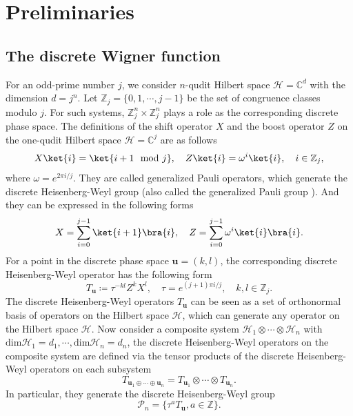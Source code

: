 \documentclass[aps,pra,twocolumn,floatfix,amsfonts,10pt]{revtex4-2}
\begin{document}
\section{Preliminaries}

\subsection{The discrete Wigner function}
For an odd-prime number $j$, we consider $n$-qudit Hilbert space $\mathcal{H}=\mathbb{C}^d$ with the dimension $d=j^n$.
Let $\mathbb{Z}_{j} = \{0,1,\cdots,j-1\}$ be the set of congruence classes modulo $j$.
For such systems, $\mathbb{Z}_{j}^{n} \times \mathbb{Z}_{j}^{n}$ plays a role as the corresponding discrete phase space. 
The definitions of the shift operator $X$ and the boost operator $Z$ on the one-qudit Hilbert space $\mathcal{H} = \mathbb{C}^j$ are as follows \cite{S1960}
\begin{equation}
	X \ket{i} = \ket{i+1\mod j}, \quad Z \ket{i} = \omega^i \ket{i}, \quad i \in \mathbb{Z}_{j}, 
\end{equation}
where $\omega = e^{2 \pi i/j}$.
They are called generalized Pauli operators, which generate the discrete Heisenberg-Weyl group (also called the generalized Pauli group \cite{G1997}). 
And they can be expressed in the following forms
\begin{equation}
	X = \sum_{i=0}^{j-1} \ket{i+1} \bra{i}, \quad Z=\sum_{i=0}^{j-1} \omega^i \ket{i} \bra{i}.
\end{equation}
For a point in the discrete phase space $\mathbf{u} = (k,l)$, the corresponding discrete Heisenberg-Weyl operator has the following form 
\begin{equation}
	T_{\mathbf{u}} \coloneqq \tau^{-kl} Z^k X^l,\quad \tau = e^{(j+1)\pi i/j},\quad  k,l \in \mathbb{Z}_{j}.
\end{equation}
The discrete Heisenberg-Weyl operators $T_\mathbf{u}$ can be seen as a set of orthonormal basis of operators on the Hilbert space $\mathcal{H}$, which can generate any operator on the Hilbert space $\mathcal{H}$. 
Now consider a composite system $\mathcal{H}_1 \otimes \cdots \otimes \mathcal{H}_n$ with $\mathrm{dim} \mathcal{H}_1 = d_1, \cdots, \mathrm{dim} \mathcal{H}_{n} = d_n$, the discrete Heisenberg-Weyl operators on the composite system are defined via the tensor products of the discrete Heisenberg-Weyl operators on each subsystem 
\begin{equation}
	T_{\mathbf{u}_1 \oplus \cdots \oplus \mathbf{u}_n} = T_{\mathbf{u}_1}\otimes \cdots \otimes T_{\mathbf{u}_n}.
\end{equation} 
In particular, they generate the discrete Heisenberg-Weyl group
\begin{equation}
	\mathcal{P}_n = \{\tau^a T_{\mathbf{u}}, a \in \mathbb{Z}\}.
\end{equation}
\end{document}
